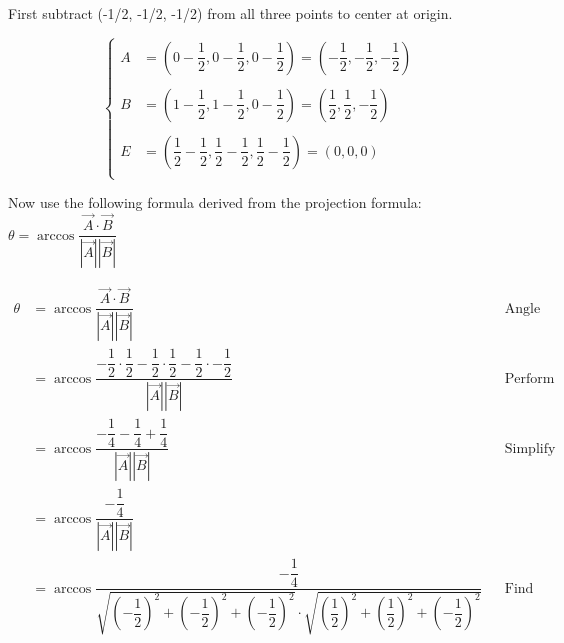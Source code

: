 \documentclass[12pt]{book}
\begin{document}
\begin{enumerate}
First subtract (-1/2, -1/2, -1/2) from all three points to center at origin.

\[ \begin{cases} 
  A & = \left( 0-\dfrac{1}{2}, 0-\dfrac{1}{2}, 0-\dfrac{1}{2} \right) = \left( -\dfrac{1}{2}, -\dfrac{1}{2}, -\dfrac{1}{2} \right) \\
  & \\
  B & = \left( 1-\dfrac{1}{2}, 1-\dfrac{1}{2}, 0-\dfrac{1}{2} \right) = \left( \dfrac{1}{2}, \dfrac{1}{2}, -\dfrac{1}{2} \right) \\
  & \\
  E & = \left( \dfrac{1}{2}-\dfrac{1}{2}, \dfrac{1}{2}-\dfrac{1}{2}, \dfrac{1}{2}-\dfrac{1}{2} \right) = ( 0, 0, 0 ) \\
\end{cases}
\]

Now use the following formula derived from the projection formula: $\theta = \arccos \dfrac{\vec{A} \cdot \vec{B}}{|\vec{A}||\vec{B}|}$

\addtolength{\jot}{1em}
\begin{align*}
  \theta &= \arccos \dfrac{\vec{A} \cdot \vec{B}}{|\vec{A}||\vec{B}|} && \text{Angle Projection Formula} \\
  &= \arccos \dfrac{-\dfrac{1}{2}\cdot\dfrac{1}{2} -\dfrac{1}{2}\cdot\dfrac{1}{2} -\dfrac{1}{2}\cdot-\dfrac{1}{2}}{|\vec{A}||\vec{B}|} && \text{Perform dot product} \\
  &= \arccos \dfrac{-\dfrac{1}{4} -\dfrac{1}{4} +\dfrac{1}{4}}{|\vec{A}||\vec{B}|} && \text{Simplify} \\
  &= \arccos \dfrac{-\dfrac{1}{4}}{|\vec{A}||\vec{B}|} \\
  &= \arccos \dfrac{-\dfrac{1}{4}}{\sqrt{\left(-\dfrac{1}{2} \right)^2 + \left(-\dfrac{1}{2} \right)^2 + \left(-\dfrac{1}{2} \right)^2} \cdot \sqrt{\left(\dfrac{1}{2} \right)^2 + \left(\dfrac{1}{2} \right)^2 + \left(-\dfrac{1}{2} \right)^2}} && \text{Find scalar of A and B} \\
\end{align*}

\newpage


\end{enumerate}
\end{document}
